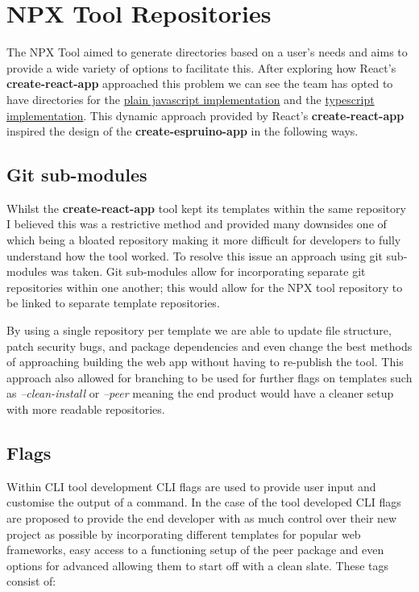 \documentclass{l4proj}
\begin{document}
\section{NPX Tool Repositories}
The NPX Tool aimed to generate directories based on a user's needs and aims to provide a wide variety of options to facilitate this. After exploring how React's \textbf{create-react-app} approached this problem we can see the team has opted to have directories for the \href{https://github.com/facebook/create-react-app/tree/main/packages/cra-template}{plain javascript implementation} and the \href{https://github.com/facebook/create-react-app/tree/main/packages/cra-template-typescript}{typescript implementation}. This dynamic approach provided by React's \textbf{create-react-app} inspired the design of the \textbf{create-espruino-app} in the following ways.

\subsection{Git sub-modules}
Whilst the \textbf{create-react-app} tool kept its templates within the same repository I believed this was a restrictive method and provided many downsides one of which being a bloated repository making it more difficult for developers to fully understand how the tool worked. To resolve this issue an approach using git sub-modules was taken. Git sub-modules allow for incorporating separate git repositories within one another; this would allow for the NPX tool repository to be linked to separate template repositories.

By using a single repository per template we are able to update file structure, patch security bugs, and package dependencies and even change the best methods of approaching building the web app without having to re-publish the tool. This approach also allowed for branching to be used for further flags on templates such as \textit{--clean-install} or \textit{--peer} meaning the end product would have a cleaner setup with more readable repositories.

\subsection{Flags}
Within CLI tool development CLI flags are used to provide user input and customise the output of a command. In the case of the tool developed CLI flags are proposed to provide the end developer with as much control over their new project as possible by incorporating different templates for popular web frameworks, easy access to a functioning setup of the peer package and even options for advanced allowing them to start off with a clean slate. These tags consist of:
\end{document}
